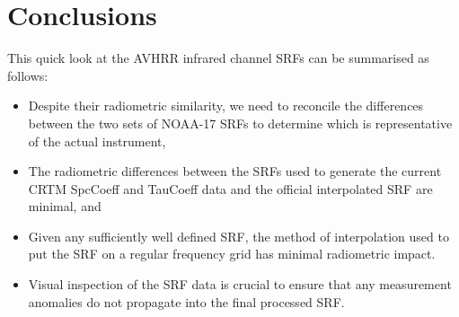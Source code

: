 \section{Conclusions}
This quick look at the AVHRR infrared channel SRFs can be summarised as follows:
\begin{itemize}
  \item Despite their radiometric similarity, we need to reconcile the differences between the two sets of NOAA-17 SRFs to determine which is representative of the actual instrument,
  \item The radiometric differences between the SRFs used to generate the current CRTM SpcCoeff and TauCoeff data and the official interpolated SRF are minimal, and
  \item Given any sufficiently well defined SRF, the method of interpolation used to put the SRF on a regular frequency grid has minimal radiometric impact.
  \item Visual inspection of the SRF data is crucial to ensure that any measurement anomalies do not propagate into the final processed SRF.
\end{itemize}
